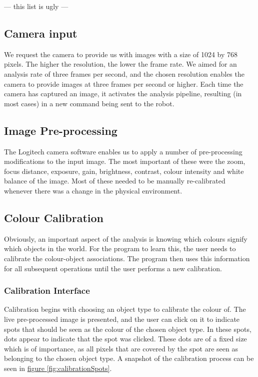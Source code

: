 \documentclass[10pt, abstracton, twocolumn]{scrartcl}
\newcommand{\fref}[1]{\hyperref[#1]{figure \vref{#1}}}
\begin{document}
--- this list is ugly ---

\subsection{Camera input}
We request the camera to provide us with images with a size of 1024 by 768 pixels. The higher the resolution, the lower the frame rate. We aimed for an analysis rate of three frames per second, and the chosen resolution enables the camera to provide images at three frames per second or higher. Each time the camera has captured an image, it activates the analysis pipeline, resulting (in most cases) in a new command being sent to the robot.

\subsection{Image Pre-processing}
The Logitech camera software enables us to apply a number of pre-processing modifications to the input image. The most important of these were the zoom, focus distance, exposure, gain, brightness, contrast, colour intensity and white balance of the image. Most of these needed to be manually re-calibrated whenever there was a change in the physical environment.


\subsection{Colour Calibration}
Obviously, an important aspect of the analysis is knowing which colours signify which objects in the world. For the program to learn this, the user needs to calibrate the colour-object associations. The program then uses this information for all subsequent operations until the user performs a new calibration.

\subsubsection{Calibration Interface}
Calibration begins with choosing an object type to calibrate the colour of. The live pre-processed image is presented, and the user can click on it to indicate spots that should be seen as the colour of the chosen object type. In these spots, dots appear to indicate that the spot was clicked. These dots are of a fixed size which is of importance, as all pixels that are covered by the spot are seen as belonging to the chosen object type. A snapshot of the calibration process can be seen in \fref{fig:calibrationSpots}.
\end{document}
